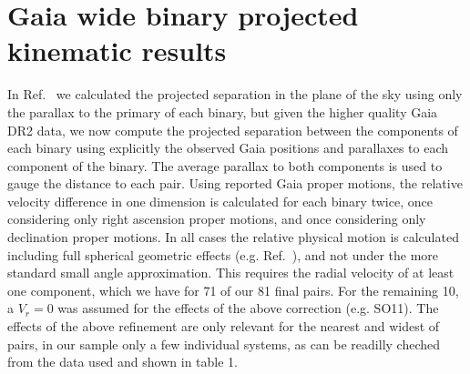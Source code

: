 \documentclass{ws-ijmpd}
\begin{document}
\section{Gaia wide binary projected kinematic results}





In Ref.~ we calculated the projected separation in the plane of the sky using only the parallax to the
primary of each binary, but given the higher quality Gaia DR2 data, we now compute the projected separation between the
components of each binary using explicitly the observed Gaia positions and parallaxes to each component of the binary.
The average parallax to both components is used to gauge the distance to each pair. Using reported Gaia proper motions,
the relative velocity difference in one dimension is calculated for each binary twice, once considering only right ascension
proper motions, and once considering only declination proper motions. In all cases the relative physical motion is calculated
including full spherical geometric effects (e.g. Ref.~), and not under the more standard small angle approximation.
This requires the radial velocity of at least one component, which we have for 71 of our 81 final pairs. For the remaining
10, a $V_{r}=0$ was assumed for the effects of the above correction (e.g. SO11). The effects of the above refinement are only
relevant for the nearest and widest of pairs, in our sample only a few individual systems, as can be readilly cheched from the
data used and shown in table 1.
\end{document}
